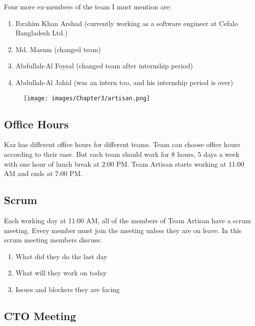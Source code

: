 Four more ex-members of the team I must mention are:

\begin{enumerate}
    \item Ibrahim Khan Arshad (currently working as a software engineer at Cefalo Bangladesh Ltd.)
    \item Md. Masum (changed team)
    \item Abdullah-Al Foysal (changed team after internship period)
    \item Abdullah-Al Jahid (was an intern too, and his internship period is over)
\end{enumerate}

\begin{figure}[h]
    \begin{center}
        \texttt{[image: images/Chapter3/artisan.png]}
        \label{fig:team_artisan}
    \end{center}
\end{figure}

\subsection{Office Hours}

Kaz has different office hours for different teams.
Team can choose office hours according to their ease.
But each team should work for 8 hours, 5 days a week with one hour of lunch break at 2:00 PM.
Team Artisan starts working at 11:00 AM and ends at 7:00 PM.

\subsection{Scrum}

Each working day at 11:00 AM, all of the members of Team Artisan have a scrum meeting.
Every member must join the meeting unless they are on leave.
In this scrum meeting members discuss:

\begin{enumerate}
    \item What did they do the last day
    \item What will they work on today
    \item Issues and blockers they are facing
\end{enumerate}

\subsection{CTO Meeting}

